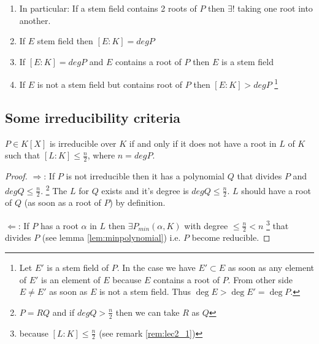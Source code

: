 \begin{remark}
  \begin{enumerate}
  \item In particular: If a stem field contains 2 roots of $P$ then
    $\exists!$  taking one root into
    another.
  \item If $E$ stem field then $\left[E:K\right] = deg P$
  \item If $\left[E:K\right] = deg P$ and $E$ contains a root of $P$
    then $E$ is a stem field
  \item If $E$ is not a stem field but contains root of $P$ then
    $\left[E:K\right] > deg P$
    \footnote{
      Let $E'$ is a stem field of $P$. In the case we have
      $E' \subset E$ as soon as any element of $E'$ is an element of
      $E$ because $E$ contains a root of $P$.
      From other side $E \ne E'$ as soon as $E$ is not a stem field.
      Thus $\deg E > \deg E' = \deg P$.
    }
  \end{enumerate}
  \label{rem:lec2_1}
\end{remark}

\subsection{Some irreducibility criteria}

\begin{corollary}
  $P \in K\left[X\right]$ is irreducible over $K$ if and only if it
  does not have a root in  $L$ of $K$ such that
  $\left[L:K\right] \le \frac{n}{2}$, where $n = deg P$.
  \label{cor:lec2_1}
  \begin{proof}
    $\Rightarrow$: If $P$ is not irreducible then it has a polynomial $Q$ that
    divides $P$ and $deg Q \le \frac{n}{2}$.
    \footnote{
      $P = RQ$ and if
      $deg Q > \frac{n}{2}$ then we can take $R$ as $Q$
    }
    The
     $L$ for $Q$ exists and it's degree is $deg Q
    \le \frac{n}{2}$. $L$ should have a root of $Q$ (as soon as a root of
    $P$) by definition.

    $\Leftarrow$: If $P$ has a root $\alpha$ in $L$ then $\exists
    P_{min}\left(\alpha, K\right)$ with degree
    $\le \frac{n}{2} < n$
    \footnote{
      because
      $\left[L:K\right] \le \frac{n}{2}$
      (see remark
      \ref{rem:lec2_1})
    }
    that divides $P$ (see lemma \ref{lem:minpolynomial}) i.e. $P$
    become reducible. 
  \end{proof}
\end{corollary}

